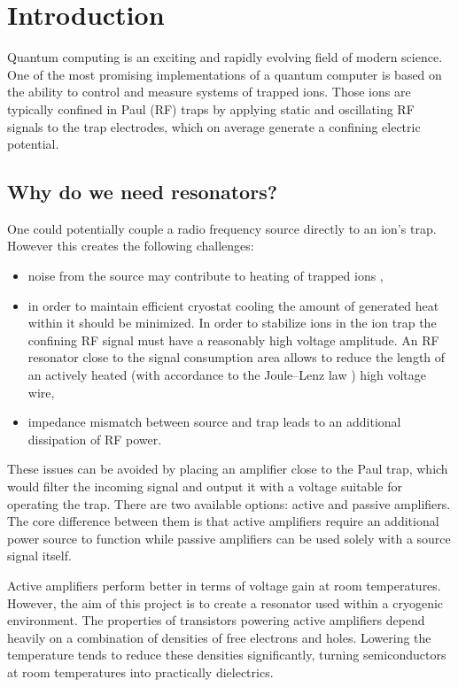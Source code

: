\newcommand{\package}{\emph}

\chapter{Introduction}
Quantum computing is an exciting and rapidly evolving field of modern science. One of the most promising implementations of a quantum computer is based on the ability to control and measure systems of trapped ions. Those ions are typically confined in Paul (RF) \cite{Paul1990} traps by applying static and oscillating RF signals to the trap electrodes, which on average generate a confining electric potential.
\section{Why do we need resonators?}
\label{sec:why_resonators}
One could potentially couple a radio frequency source directly to an ion's trap. However this creates the following challenges:
\begin{itemize}
	\item noise from the source may contribute to heating of trapped ions \cite{Turchette2000},
	\item in order to maintain efficient cryostat cooling the amount of generated heat within it should be minimized. In order to stabilize ions in the ion trap the 	confining RF signal must have a reasonably high voltage amplitude. An RF resonator close to the signal consumption area allows to reduce the length of an actively heated (with accordance to the Joule–Lenz law \cite{Prokhorov1972}) high voltage wire,
	\item impedance mismatch between source and trap leads to an additional dissipation of RF power.
\end{itemize}
These issues can be avoided by placing an amplifier close to the Paul trap, which would filter the incoming signal and output it with a voltage suitable for operating the trap. There are two available options: active and passive amplifiers. The core difference between them is that active amplifiers require an additional power source to function while passive amplifiers can be used solely with a source signal itself. 

Active amplifiers perform better in terms of voltage gain at room temperatures. However, the aim of this project is to create a resonator used within a cryogenic environment. The properties of transistors powering active amplifiers depend heavily on a combination of densities of free electrons and holes. Lowering the temperature tends to reduce \cite{Dirac1926} these densities significantly, turning semiconductors at room temperatures into practically dielectrics. 

